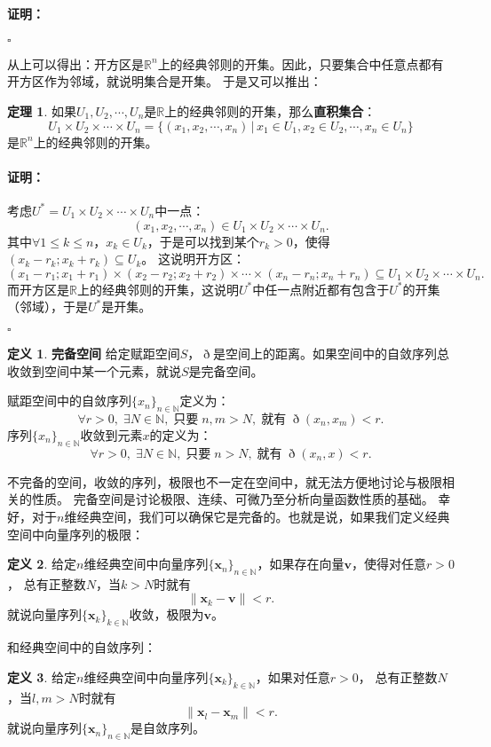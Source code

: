 \documentclass[12pt,UTF8]{ctexbook}
\theoremstyle{definition}
\newtheorem{df}{定义}[section]
\newtheorem{tm}{定理}[section]
\theoremstyle{plain}
\renewenvironment{proof}{\paragraph{\textbf{证明：}}}{\hfill$\square$}
\begin{document}
\begin{appendix}
\begin{proof}
\end{proof}

从上可以得出：开方区是$\mathbb{R}^n$上的经典邻则的开集。因此，只要集合中任意点都有开方区作为邻域，就说明集合是开集。
于是又可以推出：

\begin{tm}\label{tm:b-1-20}
    如果$U_1,U_2,\cdots, U_n$是$\mathbb{R}$上的经典邻则的开集，那么\textbf{直积集合}：
    $$ U_1\times U_2\times \cdots \times U_n = \{(x_1, x_2, \cdots, x_n) \, | \, x_1\in U_1, x_2\in U_2, \cdots , x_n\in U_n\} $$
    是$\mathbb{R}^n$上的经典邻则的开集。
\end{tm}

\begin{proof}
    考虑$U^* = U_1\times U_2\times \cdots \times U_n$中一点：
    $$ (x_1, x_2, \cdots, x_n) \in U_1\times U_2\times \cdots \times U_n. $$
    其中$\forall 1\leqslant k\leqslant n$，$x_k\in U_k$，于是可以找到某个$r_k>0$，使得$(x_k-r_k;x_k+r_k)\subseteq U_k$。
    这说明开方区：
    $$ (x_1-r_1;x_1+r_1)\times(x_2-r_2;x_2+r_2)\times\cdots\times(x_n-r_n;x_n+r_n) \subseteq U_1\times U_2\times \cdots \times U_n. $$
    而开方区是$\mathbb{R}$上的经典邻则的开集，这说明$U^*$中任一点附近都有包含于$U^*$的开集（邻域），于是$U^*$是开集。

\end{proof}

\begin{df}{\textbf{完备空间}}
    给定赋距空间$S$，$\eth$是空间上的距离。如果空间中的自敛序列总收敛到空间中某一个元素，就说$S$是完备空间。

    赋距空间中的自敛序列$\{x_n\}_{n\in\mathbb{N}}$定义为：
    $$ \forall r > 0, \; \exists N\in\mathbb{N}, \; \mbox{只要}\;n,m> N, \;\mbox{就有}\; \eth(x_n, x_m) < r.$$
    序列$\{x_n\}_{n\in\mathbb{N}}$收敛到元素$x$的定义为：
    $$ \forall r > 0, \; \exists N\in\mathbb{N}, \; \mbox{只要}\;n> N, \;\mbox{就有}\; \eth(x_n, x) < r.$$
\end{df}

不完备的空间，收敛的序列，极限也不一定在空间中，就无法方便地讨论与极限相关的性质。
完备空间是讨论极限、连续、可微乃至分析向量函数性质的基础。
幸好，对于$n$维经典空间，我们可以确保它是完备的。也就是说，如果我们定义经典空间中向量序列的极限：
\begin{df}
    给定$n$维经典空间中向量序列$\{\mathbf{x}_n\}_{n\in\mathbb{N}}$，如果存在向量$\mathbf{v}$，使得对任意$r>0$，
    总有正整数$N$，当$k>N$时就有
    $$ \| \mathbf{x}_k - \mathbf{v}\| < r. $$
    就说向量序列$\{\mathbf{x}_k\}_{k\in\mathbb{N}}$收敛，极限为$\mathbf{v}$。
\end{df}
和经典空间中的自敛序列：
\begin{df}
    给定$n$维经典空间中向量序列$\{\mathbf{x}_k\}_{k\in\mathbb{N}}$，如果对任意$r>0$，
    总有正整数$N$，当$l, m>N$时就有
    $$ \| \mathbf{x}_l - \mathbf{x}_m\| < r. $$
    就说向量序列$\{\mathbf{x}_n\}_{n\in\mathbb{N}}$是自敛序列。
\end{df}


\end{appendix}
\end{document}
